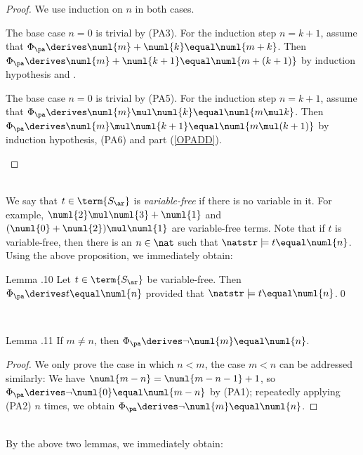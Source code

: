 \begin{proof} We use induction on $n$ in both cases.\medskip\\
\begin{inparaenum}[(a)]
%
\item The base case $n = 0$ is trivial by (PA3). For the induction step $n = k + 1$, assume that $\Phi_\pa \derives \numl{m} + \numl{k} \equal \numl{m + k}$. Then $\Phi_\pa \derives \numl{m} + \numl{k + 1} \equal \numl{m + (k + 1)}$ by induction hypothesis and .\medskip\\
%
\item The base case $n = 0$ is trivial by (PA5). For the induction step $n = k + 1$, assume that $\Phi_\pa \derives \numl{m} \mul \numl{k} \equal \numl{m \mul k}$. Then $\Phi_\pa \derives \numl{m} \mul \numl{k + 1} \equal \numl{m \mul (k + 1)}$ by induction hypothesis, (PA6) and part (\ref{OPADD}).
%
\end{inparaenum}
\end{proof}\ \medskip\\
We say that $t \in \term{S_\ar}$ is \emph{variable-free} if there is no variable in it. For example, $\numl{2} \mul \numl{3} + \numl{1}$ and $(\numl{0} + \numl{2}) \mul \numl{1}$ are variable-free terms. Note that if $t$ is variable-free, then there is an $n \in \nat$ such that $\natstr \models t \equal \numl{n}$.\bigskip\\
Using the above proposition, we immediately obtain:\medskip\\
\begin{theorem}{Lemma \thesection.10}
Let $t \in \term{S_\ar}$ be variable-free. Then $\Phi_\pa \derives t \equal \numl{n}$ provided that $\natstr \models t \equal \numl{n}$.\qed
\end{theorem}\medskip\\
\begin{theorem}{Lemma \thesection.11}
If $m \neq n$, then $\Phi_\pa \derives \neg \numl{m} \equal \numl{n}$.
\end{theorem}
\begin{proof}
We only prove the case in which $n < m$, the case $m < n$ can be addressed similarly: We have $\numl{m - n} = \numl{m - n - 1} + 1$, so $\Phi_\pa \derives \neg \numl{0} \equal \numl{m - n}$ by (PA1); repeatedly applying (PA2) $n$ times, we obtain $\Phi_\pa \derives \neg \numl{m} \equal \numl{n}$.
\end{proof}\ \medskip\\
By the above two lemmas, we immediately obtain:\medskip\\

